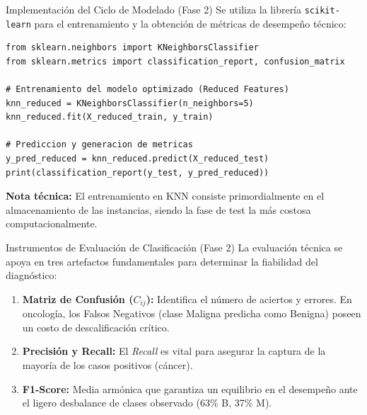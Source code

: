 \documentclass{beamer}
\begin{document}
	\begin{frame}[fragile]{Implementación del Ciclo de Modelado (Fase 2)}
		Se utiliza la librería \texttt{scikit-learn} para el entrenamiento y la obtención de métricas de desempeño técnico:
		
		\begin{lstlisting}[style=colab]
from sklearn.neighbors import KNeighborsClassifier
from sklearn.metrics import classification_report, confusion_matrix

# Entrenamiento del modelo optimizado (Reduced Features)
knn_reduced = KNeighborsClassifier(n_neighbors=5)
knn_reduced.fit(X_reduced_train, y_train)

# Prediccion y generacion de metricas
y_pred_reduced = knn_reduced.predict(X_reduced_test)
print(classification_report(y_test, y_pred_reduced))
		\end{lstlisting}
		\textbf{Nota técnica:} El entrenamiento en KNN consiste primordialmente en el almacenamiento de las instancias, siendo la fase de test la más costosa computacionalmente.
	\end{frame}
	
	\begin{frame}{Instrumentos de Evaluación de Clasificación (Fase 2)}
		La evaluación técnica se apoya en tres artefactos fundamentales para determinar la fiabilidad del diagnóstico:
		
		\begin{enumerate}
			\item<2-> \textbf{Matriz de Confusión ($C_{ij}$):} Identifica el número de aciertos y errores. En oncología, los Falsos Negativos (clase Maligna predicha como Benigna) poseen un costo de descalificación crítico.
			\item<3-> \textbf{Precisión y Recall:} El \textit{Recall} es vital para asegurar la captura de la mayoría de los casos positivos (cáncer).
			\item<4-> \textbf{F1-Score:} Media armónica que garantiza un equilibrio en el desempeño ante el ligero desbalance de clases observado (63\% B, 37\% M).
		\end{enumerate}
	\end{frame}
	
\end{document}
